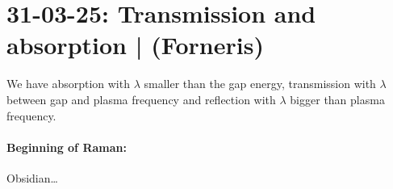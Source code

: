 \section{31-03-25: Transmission and absorption | (Forneris)}

We have absorption with $\lambda$ smaller than the gap energy, transmission with $\lambda$ between gap and plasma frequency and reflection with $\lambda$ bigger than plasma frequency.

\paragraph{Beginning of Raman:} Obsidian\dots